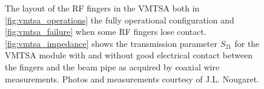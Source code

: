 \begin{figure}
\begin{center}
\end{center}
\caption{The layout of the RF fingers in the VMTSA both in \ref{fig:vmtsa_operations} the fully operational configuration and \ref{fig:vmtsa_failure} when some RF fingers lose contact. \ref{fig:vmtsa_impedance} shows the transmission parameter $S_{21}$ for the VMTSA module with and without good electrical contact between the fingers and the beam pipe as acquired by coaxial wire measurements. Photos and measurements courtesy of J.L. Nougaret.}
\label{fig:rf_finger_imp}
\end{figure}
